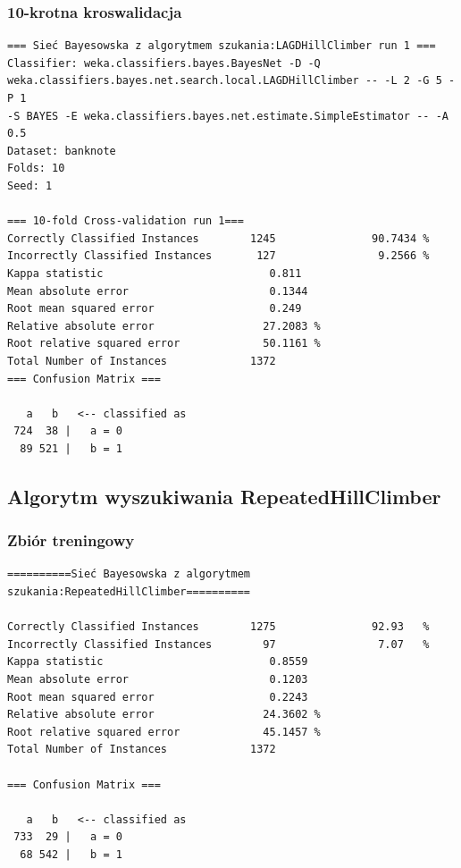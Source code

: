 \documentclass{classrep}
\begin{document}
\subsubsection*{10-krotna kroswalidacja}
\scriptsize 
\begin{verbatim}
=== Sieć Bayesowska z algorytmem szukania:LAGDHillClimber run 1 ===
Classifier: weka.classifiers.bayes.BayesNet -D -Q
weka.classifiers.bayes.net.search.local.LAGDHillClimber -- -L 2 -G 5 -P 1
-S BAYES -E weka.classifiers.bayes.net.estimate.SimpleEstimator -- -A 0.5
Dataset: banknote
Folds: 10
Seed: 1

=== 10-fold Cross-validation run 1===
Correctly Classified Instances        1245               90.7434 %
Incorrectly Classified Instances       127                9.2566 %
Kappa statistic                          0.811 
Mean absolute error                      0.1344
Root mean squared error                  0.249 
Relative absolute error                 27.2083 %
Root relative squared error             50.1161 %
Total Number of Instances             1372     
=== Confusion Matrix ===

   a   b   <-- classified as
 724  38 |   a = 0
  89 521 |   b = 1
\end{verbatim} 
\normalsize

\subsection{Algorytm wyszukiwania RepeatedHillClimber}
\subsubsection*{Zbiór treningowy}
\scriptsize 
\begin{verbatim}
==========Sieć Bayesowska z algorytmem szukania:RepeatedHillClimber==========

Correctly Classified Instances        1275               92.93   %
Incorrectly Classified Instances        97                7.07   %
Kappa statistic                          0.8559
Mean absolute error                      0.1203
Root mean squared error                  0.2243
Relative absolute error                 24.3602 %
Root relative squared error             45.1457 %
Total Number of Instances             1372     

=== Confusion Matrix ===

   a   b   <-- classified as
 733  29 |   a = 0
  68 542 |   b = 1
\end{verbatim} 
\normalsize
\end{document}
